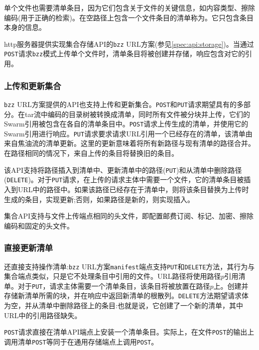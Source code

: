单个文件也需要清单条目，因为它们包含关于文件的关键信息，如内容类型、擦除编码(用于正确的检索)。在空路径上包含一个文件条目的清单称为。它只包含条目本身的信息。

http服务器提供实现集合存储API的\lstinline{bzz} URL方案(参见\ref{spec:api:storage})。当通过\lstinline{POST}请求\lstinline{bzz}模式上传单个文件时，清单条目将被创建并存储，响应包含对它的引用。

\subsubsection{上传和更新集合}

\lstinline{bzz} URL方案提供的API也支持上传和更新集合。\lstinline{POST}和\lstinline{PUT}请求期望具有的多部分。在tar流中编码的目录树被转换成清单，同时所有文件被分块并上传，它们的Swarm引用被包含在各自的清单条目中。\lstinline{POST}请求上传生成的清单，并使用它的Swarm引用进行响应。\lstinline{PUT}请求要求请求URL引用一个已经存在的清单，该清单由来自焦油流的清单更新。这里的更新意味着将所有新路径与现有清单的路径合并。在路径相同的情况下，来自上传的条目将替换旧的条目。

该API支持将路径插入到清单中、更新清单中的路径(\lstinline{PUT})和从清单中删除路径(\lstinline{DELETE})。对于\lstinline{PUT}请求，在上传的请求主体中需要一个文件，它的清单条目被插入到URL中的路径中。如果该路径已经存在于清单中，则将该条目替换为上传时生成的条目，实现更新;否则，如果路径是新的，则实现插入。

集合API支持与文件上传端点相同的头文件，即配置邮费订阅、标记、加密、擦除编码和固定的头文件。

\subsubsection{直接更新清单}

还直接支持操作清单:\lstinline{bzz} URL方案\lstinline{manifest}端点支持\lstinline{PUT}和\lstinline{DELETE}方法，其行为与集合端点类似，只是它不处理条目中引用的文件。URL路径将使用路径$p$引用清单。对于\lstinline{PUT}，请求主体需要一个清单条目，该条目将被放置在路径$p$上。创建并存储新清单所需的块，并在响应中返回新清单的根散列。\lstinline{DELETE}方法期望请求体为空，并从清单中删除路径上的条目:也就是说，它创建了一个新的清单，其中URL中的引用路径缺失。

\lstinline{POST}请求直接在清单API端点上安装一个清单条目。实际上，在文件\lstinline{POST}的输出上调用清单\lstinline{POST}等同于在通用存储端点上调用\lstinline{POST}。


